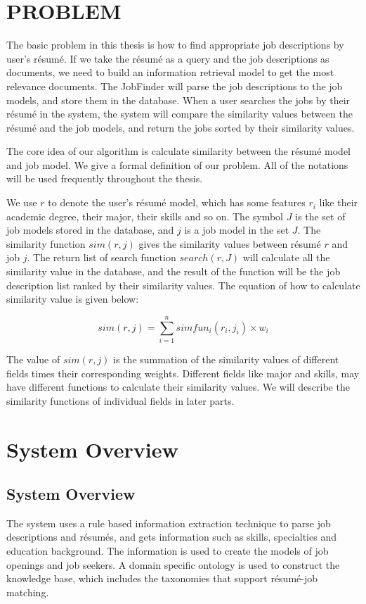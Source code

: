 \chapter{PROBLEM}

The basic problem in this thesis is how to find appropriate job descriptions by user's r\'esum\'e. If we take the r\'esum\'e as a query and the job descriptions as documents, we need to build an information retrieval model to get the most relevance documents.  The JobFinder will parse the job descriptions to the job models, and store them in the database. When a user searches the jobs by their r\'esum\'e in the system, the system will compare the similarity values between the r\'esum\'e and the job models, and return the jobs sorted by their similarity values.

The core idea of our algorithm is calculate similarity between the r\'esum\'e model and job model.
We give a formal definition of our problem. All of the notations will be used frequently throughout the thesis.

We use $r$ to denote the user's r\'esum\'e model, which has some features $r_i$ like their academic degree, their major, their skills and so on. The symbol $J$ is the set of job models stored in the database, and $j$ is a job model in the set $J$. The similarity function $sim(r, j)$ gives the similarity values between r\'esum\'e $r$ and job $j$. The return list of search function $search(r,J)$ will calculate all the similarity value in the database, and the result of the function will be the job description list ranked by their similarity values. The equation of how to calculate similarity value is given below:

$$ sim(r, j) = \sum_{i=1}^{n} simfun_i(r_i,j_i) \times w_i $$

The value of $sim(r, j)$ is the summation of the similarity values of different fields times their corresponding weights. Different fields like major and skills,  may have different functions to calculate their similarity values. We will describe the similarity functions of individual fields in later parts.


\chapter{System Overview}

\section{System Overview}
The system uses a rule based information extraction technique to parse job descriptions and r\'esum\'es, and gets information such as skills, specialties and education background. The information is used to create the models of job openings and job seekers. A domain specific ontology is used to construct the knowledge base, which includes the taxonomies that support r\'esum\'e-job matching.

